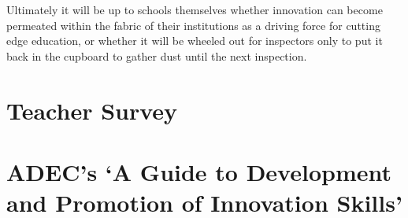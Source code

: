\documentclass[11pt]{article}
\begin{document}
Ultimately it will be up to schools themselves whether innovation can become permeated within the fabric of their institutions as a driving force for cutting edge education, or whether it will be wheeled out for inspectors only to put it back in the cupboard to gather dust until the next inspection.




\begin{appendices}
	\section{Teacher Survey}
	\label{appendix:teachersurvey}
    
	
	\section{ADEC's `A Guide to Development and Promotion of Innovation Skills'}
	\label{appendix:adec}
	
	
\end{appendices}
\end{document}
